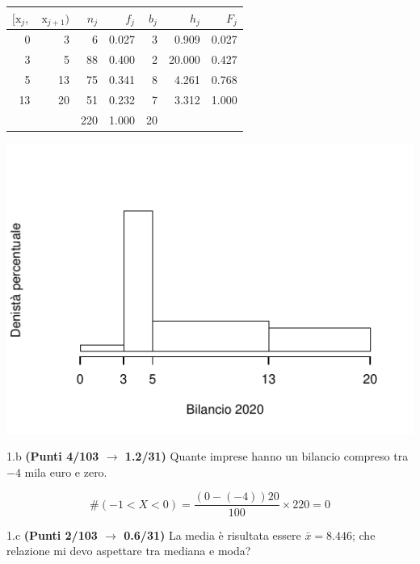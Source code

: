 \documentclass[
  11pt,
]{book}
\theoremstyle{mytheoremstyle}
\theoremstyle{mydefstyle}
\newenvironment{sol}
  {
  \begin{tcolorbox}[enhanced,breakable,arc=0.1mm,boxrule=1pt,colback=white,colframe=iblue,
  title=\bf \fontfamily{lmss}\selectfont \hspace{.5 cm} Soluzione,drop fuzzy shadow]

}{
\end{tcolorbox}
  }
\begin{document}
\begin{sol}

\begin{table}[H]
\centering
\begin{tabular}{rrrrrrr}
\toprule
$[\text{x}_j,$ & $\text{x}_{j+1})$ & $n_j$ & $f_j$ & $b_j$ & $h_j$ & $F_j$\\
\midrule
0 & 3 & 6 & 0.027 & 3 & 0.909 & 0.027\\
3 & 5 & 88 & 0.400 & 2 & 20.000 & 0.427\\
5 & 13 & 75 & 0.341 & 8 & 4.261 & 0.768\\
13 & 20 & 51 & 0.232 & 7 & 3.312 & 1.000\\
 &  & 220 & 1.000 & 20 &  & \\
\bottomrule
\end{tabular}
\end{table}

\begin{center}\includegraphics{Esami_passati_con_soluzioni_files/figure-latex/2022-80-1} \end{center}

\end{sol}

1.b \textbf{(Punti 4/103 \(\rightarrow\) 1.2/31)} Quante imprese hanno un bilancio compreso tra \(-4\) mila
euro e zero.

\begin{sol}
\[\#(-1<X<0)=\frac{(0-(-4))20}{100}\times 220=0\]

\end{sol}

1.c \textbf{(Punti 2/103 \(\rightarrow\) 0.6/31)} La media è risultata essere \(\bar x=8.446\); che
relazione mi devo aspettare tra mediana e moda?
\end{document}
